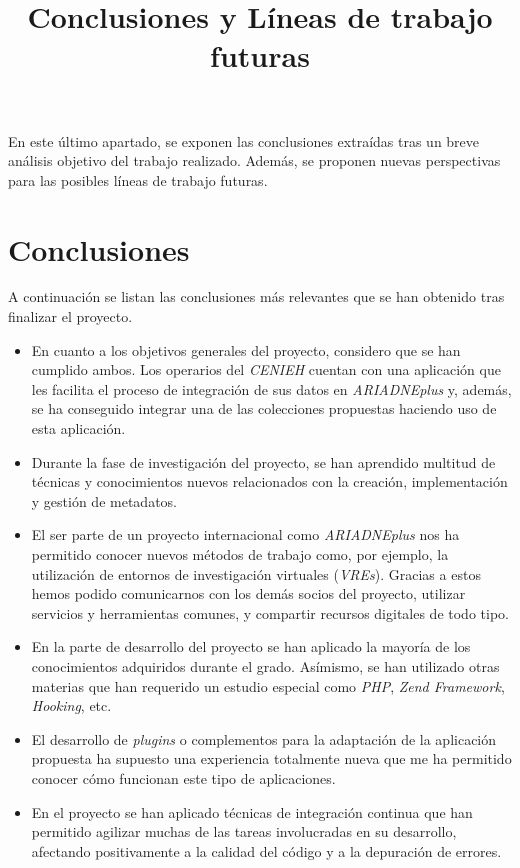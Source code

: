 \documentclass[
]{article}
\title{Conclusiones y Líneas de trabajo futuras}
\author{}
\date{}
\providecommand{\tightlist}{%
  \setlength{\itemsep}{0pt}\setlength{\parskip}{0pt}}
\begin{document}
\maketitle

En este último apartado, se exponen las conclusiones extraídas tras un
breve análisis objetivo del trabajo realizado. Además, se proponen
nuevas perspectivas para las posibles líneas de trabajo futuras.

\hypertarget{conclusiones}{%
\section{Conclusiones}\label{conclusiones}}

A continuación se listan las conclusiones más relevantes que se han
obtenido tras finalizar el proyecto.

\begin{itemize}
\tightlist
\item
  En cuanto a los objetivos generales del proyecto, considero que se han
  cumplido ambos. Los operarios del \emph{CENIEH} cuentan con una
  aplicación que les facilita el proceso de integración de sus datos en
  \emph{ARIADNEplus} y, además, se ha conseguido integrar una de las
  colecciones propuestas haciendo uso de esta aplicación.
\item
  Durante la fase de investigación del proyecto, se han aprendido
  multitud de técnicas y conocimientos nuevos relacionados con la
  creación, implementación y gestión de metadatos.
\item
  El ser parte de un proyecto internacional como \emph{ARIADNEplus} nos
  ha permitido conocer nuevos métodos de trabajo como, por ejemplo, la
  utilización de entornos de investigación virtuales (\emph{VREs}).
  Gracias a estos hemos podido comunicarnos con los demás socios del
  proyecto, utilizar servicios y herramientas comunes, y compartir
  recursos digitales de todo tipo.
\item
  En la parte de desarrollo del proyecto se han aplicado la mayoría de
  los conocimientos adquiridos durante el grado. Asímismo, se han
  utilizado otras materias que han requerido un estudio especial como
  \emph{PHP}, \emph{Zend Framework}, \emph{Hooking}, etc.
\item
  El desarrollo de \emph{plugins} o complementos para la adaptación de
  la aplicación propuesta ha supuesto una experiencia totalmente nueva
  que me ha permitido conocer cómo funcionan este tipo de aplicaciones.
\item
  En el proyecto se han aplicado técnicas de integración continua que
  han permitido agilizar muchas de las tareas involucradas en su
  desarrollo, afectando positivamente a la calidad del código y a la
  depuración de errores.
\end{itemize}
\end{document}
